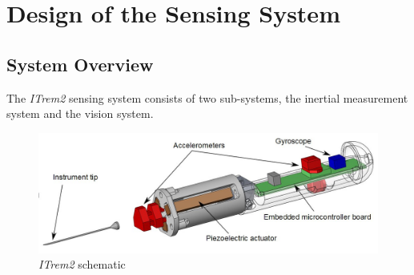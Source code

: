 \chapter{Design of the Sensing System}
\label{ch:System}

\section{System Overview}
\label{Sec:SystemOverview}

The \textit{ITrem2} sensing system consists of two sub-systems, the inertial measurement system and the vision system. 

\begin{figure}[htbp!]
 \centering
 \includegraphics[width=1\textwidth]{./Fig/Fig_InstrumentComponents.jpg}
 \caption{\textit{ITrem2} schematic}
 \label{Fig_InstrumentComponents}
\end{figure}
